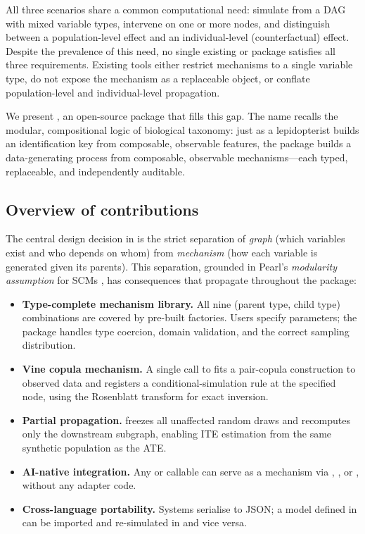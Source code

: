 \documentclass[article]{jss}
\begin{document}
All three scenarios share a common computational need: simulate from a DAG with
mixed variable types, intervene on one or more nodes, and distinguish between a
population-level effect and an individual-level (counterfactual) effect. Despite
the prevalence of this need, no single existing  or 
package satisfies all three requirements. Existing tools either restrict mechanisms
to a single variable type, do not expose the mechanism as a replaceable object, or
conflate population-level and individual-level propagation.

We present , an open-source package that fills this gap. The name
recalls the modular, compositional logic of biological taxonomy: just as a
lepidopterist builds an identification key from composable, observable features,
the package builds a data-generating process from composable, observable
mechanisms---each typed, replaceable, and independently auditable.

\subsection{Overview of contributions}

The central design decision in  is the strict separation of
\emph{graph} (which variables exist and who depends on whom) from
\emph{mechanism} (how each variable is generated given its parents). This
separation, grounded in Pearl's \emph{modularity assumption} for SCMs
\citep{pearl2009causality}, has consequences that propagate throughout the package:

\begin{itemize}[leftmargin=1.8em]
  \item \textbf{Type-complete mechanism library.} All nine
        (parent type, child type) combinations are covered by pre-built factories.
        Users specify parameters; the package handles type coercion, domain
        validation, and the correct sampling distribution.
  \item \textbf{Vine copula mechanism.} A single call to
         fits a pair-copula construction to observed data
        and registers a conditional-simulation rule at the specified node, using
        the Rosenblatt transform \citep{rosenblatt1952remarks} for exact
        inversion.
  \item \textbf{Partial propagation.} 
        freezes all unaffected random draws and recomputes only the downstream
        subgraph, enabling ITE estimation from the same synthetic population as
        the ATE.
  \item \textbf{AI-native integration.} Any  or 
        callable can serve as a mechanism via ,
        , or , without any adapter
        code.
  \item \textbf{Cross-language portability.} Systems serialise to JSON; a model
        defined in  can be imported and re-simulated in
         and vice versa.
\end{itemize}
\end{document}
